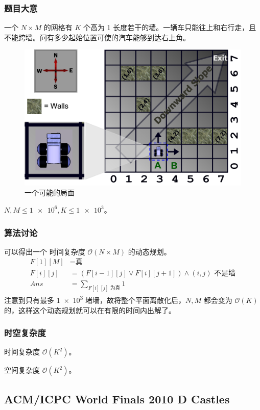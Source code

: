 			\subsubsection{题目大意}
				一个 $N \times M$ 的网格有 $K$ 个高为 1 长度若干的墙。一辆车只能往上和右行走，且不能跨墙。问有多少起始位置可使的汽车能够到达右上角。
				\begin{figure}[!htb]
					\centering
					\includegraphics[width=0.75 \textwidth]{6.png}
					\caption{一个可能的局面}
				\end{figure}
				
				$N, M \le \num{1e6}, K \le \num{1e3}$。

			\subsubsection{算法讨论}
				可以得出一个 时间复杂度 $\mathcal{O}\left(N \times M\right)$ 的动态规划。
				\begin{align}
					F[1][M] & = \text{真}\\
					F[i][j] & = (F[i - 1][j] \lor F[i][j + 1]) \land (i, j) \text{ 不是墙}\\
					Ans & = \sum_{F[i][j]\text{ 为真}} 1
				\end{align}
				注意到只有最多 \num{1e3} 堵墙，故将整个平面离散化后，$N, M$ 都会变为  $\mathcal{O}\left(K\right)$ 的，这样这个动态规划就可以在有限的时间内出解了。
			\subsubsection{时空复杂度}
				时间复杂度 $\mathcal{O}\left(K^2\right)$。
					
				空间复杂度 $\mathcal{O}\left(K^2\right)$。
		\newpage
		\subsection{ACM/ICPC World Finals 2010 D Castles}
